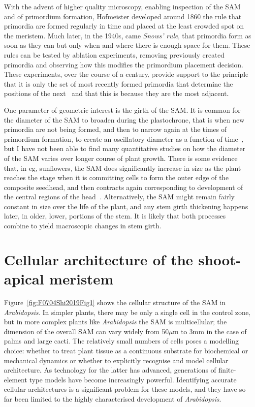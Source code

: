 With the advent of higher quality microscopy, enabling inspection of the SAM and of primordium formation,  Hofmeister developed around 1860 the rule  that primordia are formed regularly in time and placed at the least crowded spot on the meristem. Much later, in the 1940s, came \emph{Snows' rule}, that primordia form as soon as they can but only when and where there is enough space for them.%
 These rules can be tested by ablation experiments, removing previously created primordia and observing how this modifies the primordium placement decision. These experiments, over the course of a century, provide support to the principle that it is only the set of most recently formed primordia that determine the positions of the next~\autocite{snowExperimentsPhyllotaxisII1933,reinhardtRegulationPhyllotaxisPolar2003} and that this is because they are the most adjacent. 
 
 One parameter of geometric interest is the girth of the SAM.  It is common for the diameter of the SAM to broaden during the plastochrone, that is when new primordia are not being formed, and then to narrow again at the times of primordium formation, to create an oscillatory diameter as a function of time~\autocite{cronkMolecularOrganographyPlants2009}, but I have not been able to find many quantitative studies on how the diameter of the SAM varies over longer course of plant growth. There is some evidence that, in eg, sunflowers, the SAM does significantly increase in size as the plant reaches the stage when it is committing cells to form the outer edge of the composite seedhead, and then contracts again  corresponding to development of the central regions of the head~\cite{palmerPhysiologicalBasisPattern1998}. Alternatively, the SAM might remain fairly constant in size over the life of the plant, and any stem girth thickening happens later, in older,  lower, portions of the stem. It is likely that both processes combine to yield  macroscopic changes in stem girth. 
 

\section{Cellular architecture of the shoot-apical meristem}
Figure~\ref{fig:F0704Shi2019Fig1} shows the cellular structure of the SAM in \textit{Arabidopsis}.  In simpler plants, there may be only a single cell in the control zone, but in more complex plants like \textit{Arabidopsis} the SAM is multicellular; the dimension of the overall SAM can vary widely from 50$\mu$m to 3mm in the case of palms and large cacti. The relatively small numbers of cells poses a modelling choice: whether to treat  plant tissue as a continuous substrate for biochemical or mechanical dynamics or whether to explicitly recognise and model cellular architecture. As technology for the latter has advanced, generations of finite-element type models have become increasingly powerful. Identifying accurate cellular architectures is a significant problem for these models, and they have so far been limited to the highly characterised development of \textit{Arabidopsis}. 
 
